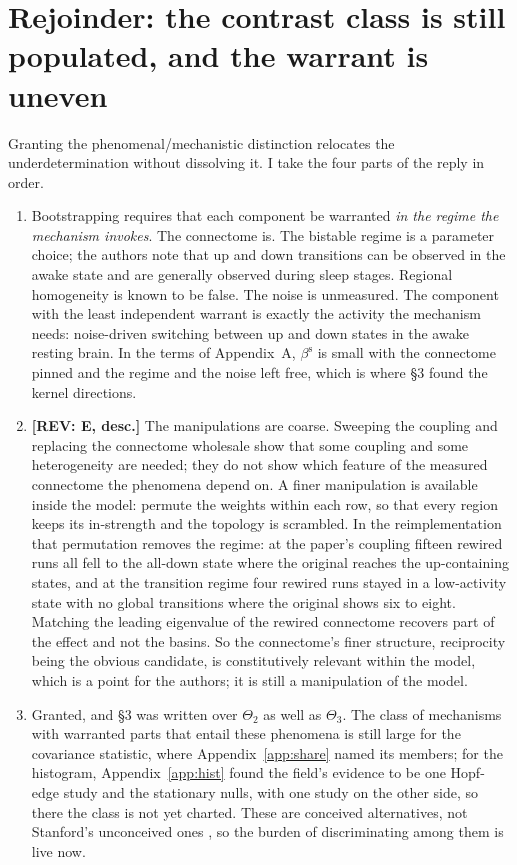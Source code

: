 \documentclass[11pt]{article}
\newcommand{\REV}[1]{\textcolor{purple!70!black}{\textbf{[REV: #1]}}}
\begin{document}
\section{Rejoinder: the contrast class is still populated, and the warrant is uneven}
Granting the phenomenal/mechanistic distinction relocates the underdetermination without dissolving it. I take the four parts of the reply in order.
\begin{enumerate}
\item[To R1] Bootstrapping requires that each component be warranted \emph{in the regime the mechanism invokes}. The connectome is. The bistable regime is a parameter choice; the authors note that up and down transitions can be observed in the awake state and are generally observed during sleep stages. Regional homogeneity is known to be false. The noise is unmeasured. The component with the least independent warrant is exactly the activity the mechanism needs: noise-driven switching between up and down states in the awake resting brain. In the terms of Appendix~A, $\beta^{\mathrm{s}}$ is small with the connectome pinned and the regime and the noise left free, which is where \S3 found the kernel directions.
\item[To R2] \REV{E, desc.} The manipulations are coarse. Sweeping the coupling and replacing the connectome wholesale show that some coupling and some heterogeneity are needed; they do not show which feature of the measured connectome the phenomena depend on. A finer manipulation is available inside the model: permute the weights within each row, so that every region keeps its in-strength and the topology is scrambled. In the reimplementation that permutation removes the regime: at the paper's coupling fifteen rewired runs all fell to the all-down state where the original reaches the up-containing states, and at the transition regime four rewired runs stayed in a low-activity state with no global transitions where the original shows six to eight. Matching the leading eigenvalue of the rewired connectome recovers part of the effect and not the basins. So the connectome's finer structure, reciprocity being the obvious candidate, is constitutively relevant within the model, which is a point for the authors; it is still a manipulation of the model.
\item[To R3] Granted, and \S3 was written over $\Theta_2$ as well as $\Theta_3$. The class of mechanisms with warranted parts that entail these phenomena is still large for the covariance statistic, where Appendix~\ref{app:share} named its members; for the histogram, Appendix~\ref{app:hist} found the field's evidence to be one Hopf-edge study and the stationary nulls, with one study on the other side, so there the class is not yet charted. These are conceived alternatives, not Stanford's unconceived ones \parencite{stanford2006}, so the burden of discriminating among them is live now.

\end{enumerate}
\end{document}
